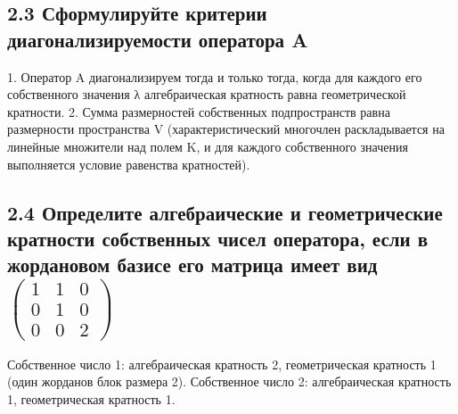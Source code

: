 \documentclass{article}
\begin{document}
\subsection*{2.3 Сформулируйте критерии диагонализируемости оператора A}
1. Оператор A диагонализируем тогда и только тогда, когда для каждого его собственного значения λ алгебраическая кратность равна геометрической кратности.
2. Сумма размерностей собственных подпространств равна размерности пространства V (характеристический многочлен раскладывается на линейные множители над полем K, и для каждого собственного значения выполняется условие равенства кратностей).

\subsection*{2.4 Определите алгебраические и геометрические кратности собственных чисел оператора, если в жордановом базисе его матрица имеет вид \( \begin{pmatrix} 1 & 1 & 0 \\ 0 & 1 & 0 \\ 0 & 0 & 2 \end{pmatrix} \)}
Собственное число 1: алгебраическая кратность 2, геометрическая кратность 1 (один жорданов блок размера 2).
Собственное число 2: алгебраическая кратность 1, геометрическая кратность 1.
\end{document}
